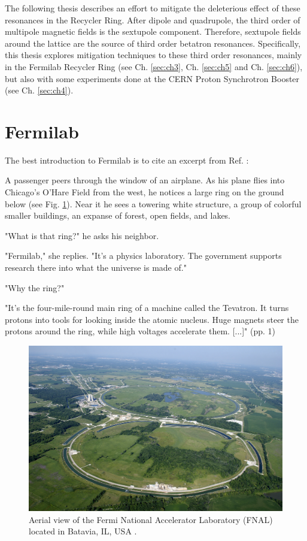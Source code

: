 The following thesis describes an effort to mitigate the deleterious effect of these resonances in the Recycler Ring. After dipole and quadrupole, the third order of multipole magnetic fields is the sextupole component. Therefore, sextupole fields around the lattice are the source of third order betatron resonances. Specifically, this thesis explores mitigation techniques to these third order resonances, mainly in the Fermilab Recycler Ring (see Ch. \ref{sec:ch3}, Ch. \ref{sec:ch5} and Ch. \ref{sec:ch6}), but also with some experiments done at the CERN Proton Synchrotron Booster (see Ch. \ref{sec:ch4}). 

\section{Fermilab}

The best introduction to Fermilab is to cite an excerpt from Ref. \cite{fermilab1}:
\begin{displayquote}
    \begin{flushleft}
    [...] A passenger peers through the window of an airplane. As his plane flies into Chicago's O'Hare Field from the west, he notices a large ring on the ground below (see Fig. \ref{fig:fermia}). Near it he sees a towering white structure, a group of colorful smaller buildings, an expanse of forest, open fields, and lakes.

    "What is that ring?" he asks his neighbor.

    "Fermilab," she replies. "It's a physics laboratory. The government supports research there into what the universe is made of."

    "Why the ring?"

    "It's the four-mile-round main ring of a machine called the Tevatron. It turns protons into tools for looking inside the atomic nucleus. Huge magnets steer the protons around the ring, while high voltages accelerate them. [...]" (pp. 1)
    \end{flushleft}
\end{displayquote}

\begin{figure}[H]
    \centering
    \includegraphics[width=\columnwidth]{chapter1/fermilab.jpeg}
    \caption{Aerial view of the Fermi National Accelerator Laboratory (FNAL) located in Batavia, IL, USA \cite{fermipic}.}
    \label{fig:fermia}
 \end{figure}

